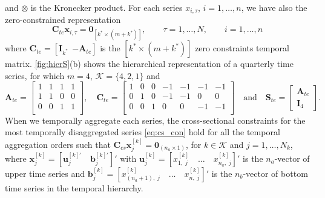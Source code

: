 \documentclass[review, 11pt]{elsarticle}
\newcommand{\bvet}{\bm{b}}
\newcommand{\uvet}{\bm{u}}
\newcommand{\xvet}{\bm{x}}
\newcommand{\Avet}{\bm{A}}
\newcommand{\Cvet}{\bm{C}}
\newcommand{\Ivet}{\bm{I}}
\newcommand{\Svet}{\bm{S}}
\newcommand{\Zerovet}{\bm{0}}
\theoremstyle{definition}
\begin{document}
and $\otimes$ is the Kronecker product. For each series $x_{i,\tau}$, $i = 1,\dots,n$, we have also the zero-constrained representation
\begin{equation}
	\label{eq:te_con}
	\Cvet_{te}\xvet_{i,\tau} = \Zerovet_{[k^\ast \times (m+k^\ast)]}, \qquad \tau = 1,\dots,N, \qquad i = 1,\dots, n
\end{equation}
where $\Cvet_{te} = [\Ivet_{k^\ast} ~~ {-\Avet_{te}}]$ is the $[k^\ast \times (m+k^\ast)]$ zero constraints temporal matrix. \autoref{fig:hierS}(b) shows the hierarchical representation of a quarterly time series, for which $m = 4$, $\mathcal{K} = \{4,2,1\}$ and
$$
	\Avet_{te} = \begin{bmatrix}
		1 & 1 & 1 & 1 \\[-0.25cm]
		1 & 1 & 0 & 0 \\[-0.25cm]
		0 & 0 & 1 & 1 \\
	\end{bmatrix}, \quad \Cvet_{te} = \begin{bmatrix}
		1 & 0 & 0 & -1 & -1 & -1 & -1 \\[-0.25cm]
		0 & 1 & 0 & -1 & -1 & 0  & 0  \\[-0.25cm]
		0 & 0 & 1 & 0  & 0  & -1 & -1 \\
	\end{bmatrix} \quad \mathrm{and} \quad \Svet_{te} = \begin{bmatrix}
		\Avet_{te} \\
		\Ivet_4
	\end{bmatrix}.
$$
When we temporally aggregate each series, the cross-sectional constraints for the most temporally disaggregated series \eqref{eq:cs_con} hold for all the temporal aggregation orders such that $\Cvet_{cs}\xvet^{[k]}_j = \Zerovet_{(n_a \times 1)}$, for $k \in \mathcal{K}$ and $j = 1, \dots, N_k$, where $\xvet_j^{[k]} = \left[\uvet_j^{[k]\prime}\quad \bvet_j^{[k]\prime}\right]'$ with $\uvet^{[k]}_j = \left[ x^{[k]}_{1,\;j}\quad \dots\quad x^{[k]}_{n_a,\;j}\right]'$ is the $n_a$-vector of upper time series and $\bvet^{[k]}_j = \left[x^{[k]}_{(n_a+1),\;j}\quad\dots\quad x^{[k]}_{n,\;j}\right]'$ is the $n_b$-vector of bottom time series in the temporal hierarchy.
\end{document}
